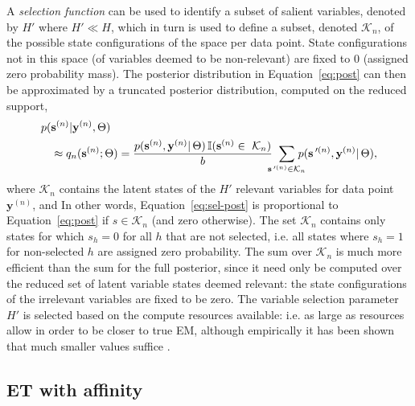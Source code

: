 \documentclass[12pt]{article}
\newcommand{\disS}{\displaystyle}
\newcommand{\Prime}{\,'}  %
\renewcommand{\vec}[1]{{\mathbf{#1}}}
\newcommand{\Kn}{\mathcal{K}_{n}}
\begin{document}
A \textit{selection function} can be used to identify a  subset
of salient variables, denoted by $H'$ where $H' \ll H$, which in turn is used to define a subset, denoted $\mathcal{K}_n$, of the possible state configurations of the space per data point. 
State configurations not in this space (of variables deemed to be non-relevant) are fixed to $0$ (assigned zero probability mass).
%
The posterior distribution in Equation~\eqref{eq:post} can then be approximated by a truncated posterior distribution, computed on the reduced support,
%
\vspace{-.1cm}
\begin{align}
\label{eq:sel-post}
p(&\vec{s}^{(n)}|\vec{y}^{(n)},\Theta) \nonumber\\
&\approx q_n(\vec{s}^{(n)};\Theta) = \frac{p(\vec{s}^{(n)},\vec{y}^{(n)}|\,\Theta) \,\rev{\mathbb{I}}(\vec{s}^{(n)}\in\,\,\Kn)} b
{\disS\hspace{-1.5mm}\sum_{\vec{s}\Prime^{(n)}\in\mathcal{K}_n}\hspace{-3mm} p(\vec{s}\Prime^{(n)},\vec{y}^{(n)}|\,\Theta)},
\end{align}
\normalsize
%
where $\Kn$ contains the latent states of the $H'$ relevant variables for data point
$\vec{y}^{(n)}$, 
and \rev{$\mathbb{I}(\vec{s}\in\mathcal{K}_n)=1$ if $\vec{s}\in\mathcal{K}_n$ is true, and $0$ otherwise.}
In other words, Equation~\eqref{eq:sel-post} is proportional to Equation~\eqref{eq:post} if $s \in \Kn$ (and zero otherwise). 
The set $\Kn$ contains only states for which $s_h=0$ for all $h$ that are not selected, i.e. all states where $s_h=1$ for non-selected $h$ are assigned zero probability.
The sum over $\Kn$ is much more efficient than the sum for the full posterior, since it need only be computed over the reduced set of latent variable states deemed relevant: the state configurations of the irrelevant variables are fixed to be zero.
The variable selection parameter $H'$ is selected based on the compute resources available: i.e. as large as resources allow in order to be closer to true EM, although empirically it has been shown that much smaller values suffice  \citep[see e.g.][App. B on complexity-accuracy trade-offs]{SheikhEtAl2014}.


\subsection{ET with affinity} 
\end{document}
